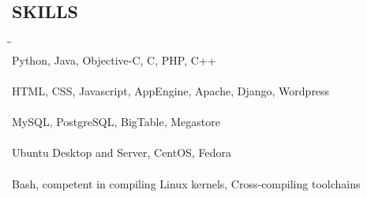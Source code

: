 \documentclass{res}
\begin{document}
\begin{resume}
\section{SKILLS}
  \vspace{-5pt}
  \begin{tabbing}
  \hspace{2.5in}\= \hspace{3.45in}\= \kill %
  \hspace{-0.25in}{\bf Programming Languages} \> \> \\
    Python, Java, Objective-C, C, PHP, C++\\
  \hspace{-0.25in}{\bf Web Development} \> \> \\
    HTML, CSS, Javascript, AppEngine, Apache, Django, Wordpress\\
  \hspace{-0.25in}{\bf Databases} \> \> \\
    MySQL, PostgreSQL, BigTable, Megastore\\
  \hspace{-0.25in}{\bf Operating Systems} \> \> \\
    Ubuntu Desktop and Server, CentOS, Fedora\\
  \hspace{-0.25in}{\bf Systems Administration} \> \> \\
    Bash, competent in compiling Linux kernels, Cross-compiling toolchains\\
  \vspace{-0.4in}


\end{tabbing}
\end{resume}
\end{document}
